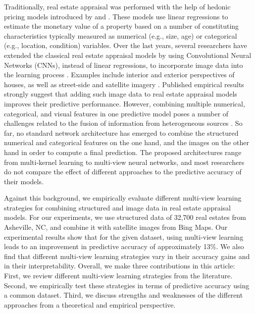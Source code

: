 \documentclass[letterpaper]{article} %
\begin{document}
Traditionally, real estate appraisal was performed with the help of hedonic pricing models introduced by \citeauthor{lancaster1966new} \citeyearpar{lancaster1966new} and \citeauthor{rosen1974hedonic} \citeyearpar{rosen1974hedonic}. These models use linear regressions to estimate the monetary value of a property based on a number of constituting characteristics typically measured as numerical (e.g., size, age) or categorical (e.g., location, condition) variables. Over the last years, several researchers have extended the classical real estate appraisal models by using Convolutional Neural Networks (CNNs), instead of linear regressions, to incorporate image data into the learning process \cite{law2019take}. Examples include interior and exterior perspectives of houses, as well as street-side and satellite imagery \cite{law2019take, poursaeed2018vision, bency2017beyond, bessinger2016quantifying, liu2018learning, kucklick2020location}. Published empirical results strongly suggest that adding such image data to real estate appraisal models improves their predictive performance. However, combining multiple numerical, categorical, and visual features in one predictive model poses a number of challenges related to the fusion of information from heterogeneous sources \cite{li2018survey}. So far, no standard network architecture has emerged to combine the structured numerical and categorical features on the one hand, and the images on the other hand in order to compute a final prediction. The proposed architectures range from multi-kernel learning to multi-view neural networks, and most researchers do not compare the effect of different approaches to the predictive accuracy of their models.

Against this background, we empirically evaluate different multi-view learning strategies for combining structured and image data in real estate appraisal models. For our experiments, we use structured data of 32,700 real estates from Asheville, NC, and combine it with satellite images from Bing Maps. Our experimental results show that for the given dataset, using multi-view learning leads to an improvement in predictive accuracy of approximately 13\%. We also find that different multi-view learning strategies vary in their accuracy gains and in their interpretability. Overall, we make three contributions in this article: First, we review different multi-view learning strategies from the literature. Second, we empirically test these strategies in terms of predictive accuracy using a common dataset. Third, we discuss strengths and weaknesses of the different approaches from a theoretical and empirical perspective.
\end{document}

